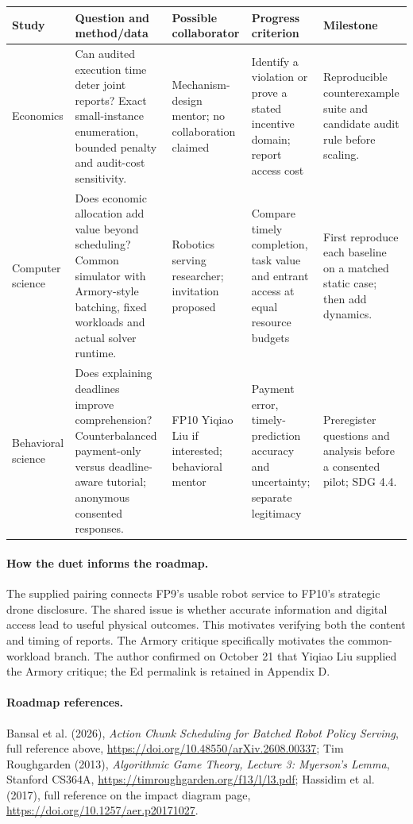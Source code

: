 \clearpage
\noindent\begin{tabularx}{\textwidth}{p{}YYYY}\toprule
Study & Question and method/data & Possible collaborator & Progress criterion & Milestone\\\midrule
Economics & Can audited execution time deter joint reports? Exact small-instance enumeration, bounded penalty and audit-cost sensitivity. & Mechanism-design mentor; no collaboration claimed & Identify a violation or prove a stated incentive domain; report access cost & Reproducible counterexample suite and candidate audit rule before scaling.\\
Computer science & Does economic allocation add value beyond scheduling? Common simulator with Armory-style batching, fixed workloads and actual solver runtime. & Robotics serving researcher; invitation proposed & Compare timely completion, task value and entrant access at equal resource budgets & First reproduce each baseline on a matched static case; then add dynamics.\\
Behavioral science & Does explaining deadlines improve comprehension? Counterbalanced payment-only versus deadline-aware tutorial; anonymous consented responses. & FP10 Yiqiao Liu if interested; behavioral mentor & Payment error, timely-prediction accuracy and uncertainty; separate legitimacy & Preregister questions and analysis before a consented pilot; SDG 4.4.\\\bottomrule
\end{tabularx}
\paragraph{How the duet informs the roadmap.} The supplied pairing connects FP9's usable robot service to FP10's strategic drone disclosure. The shared issue is whether accurate information and digital access lead to useful physical outcomes. This motivates verifying both the content and timing of reports. The Armory critique specifically motivates the common-workload branch. The author confirmed on October 21 that Yiqiao Liu supplied the Armory critique; the Ed permalink is retained in Appendix D.
\paragraph{Roadmap references.} Bansal et al. (2026), \emph{Action Chunk Scheduling for Batched Robot Policy Serving}, full reference above, \url{https://doi.org/10.48550/arXiv.2608.00337}; Tim Roughgarden (2013), \emph{Algorithmic Game Theory, Lecture 3: Myerson's Lemma}, Stanford CS364A, \url{https://timroughgarden.org/f13/l/l3.pdf}; Hassidim et al. (2017), full reference on the impact diagram page, \url{https://doi.org/10.1257/aer.p20171027}.

